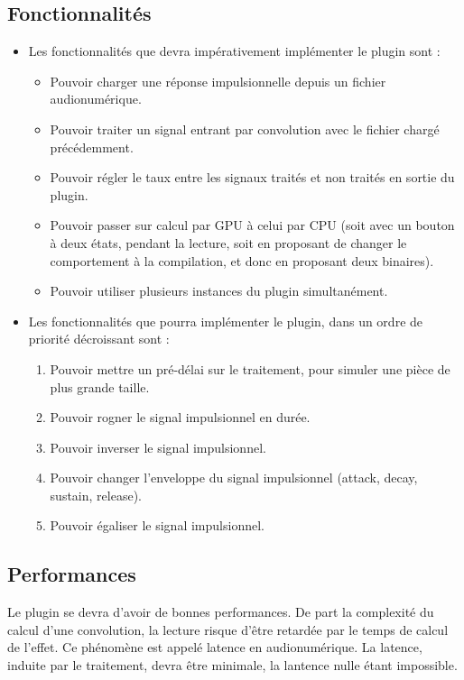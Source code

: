 		\subsection{Fonctionnalités}
			\begin{itemize}
				\item Les fonctionnalités que devra impérativement implémenter le plugin sont : 
				\begin{itemize}
					\item Pouvoir charger une réponse impulsionnelle depuis un fichier audionumérique.
					\item Pouvoir traiter un signal entrant par convolution avec le fichier chargé précédemment.
					\item Pouvoir régler le taux entre les signaux traités et non traités en sortie du plugin.
					\item Pouvoir passer sur calcul par GPU à celui par CPU (soit avec un bouton à deux états, pendant la lecture, soit en proposant de changer le comportement à la compilation, et donc en proposant deux binaires).
					\item Pouvoir utiliser plusieurs instances du plugin simultanément.
				\end{itemize}
				\item Les fonctionnalités que pourra implémenter le plugin, dans un ordre de priorité décroissant sont : 
				\begin{enumerate}
					\item Pouvoir mettre un pré-délai sur le traitement, pour simuler une pièce de plus grande taille.
					\item Pouvoir rogner le signal impulsionnel en durée.
					\item Pouvoir inverser le signal impulsionnel.
					\item Pouvoir changer l'enveloppe du signal impulsionnel (attack, decay, sustain, release).
					\item Pouvoir égaliser le signal impulsionnel.
				\end{enumerate}
			\end{itemize}

		\subsection{Performances}
			Le plugin se devra d'avoir de bonnes performances. De part la complexité du calcul d'une convolution, la lecture risque d'être retardée par le temps de calcul de l'effet. Ce phénomène est appelé latence en audionumérique.  La latence, induite par le traitement, devra être minimale, la lantence nulle étant impossible.

